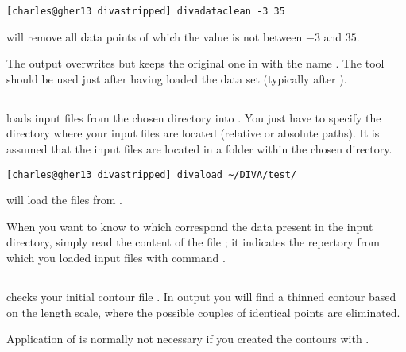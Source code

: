 \example
\begin{lstlisting}[style=Bash]
[charles@gher13 divastripped] divadataclean -3 35
\end{lstlisting}
will remove all data points of which the value is not between $-3$ and $35$.

The output overwrites  but keeps the original one in  with the name . The tool should be used just after having loaded the data set (typically after ).

\subsection{\label{sec:divaload}}

 loads input files from the chosen directory into . You just have to specify the directory where your input files are located (relative or absolute paths). It is assumed that the input files are located in a folder  within the chosen directory.

\example
\begin{lstlisting}[style=Bash]
[charles@gher13 divastripped] divaload ~/DIVA/test/
\end{lstlisting}
will load the files from .
 

\btips
When you want to know to which correspond the data present in the input directory, simply read the content of the file ; it indicates the repertory from which you loaded input files with command .
\etips


\subsection{}

 checks your initial contour file . In output  you will find a thinned contour based on the length scale, where the possible couples of identical points are eliminated.

Application of  is normally not necessary if you created the contours with .
